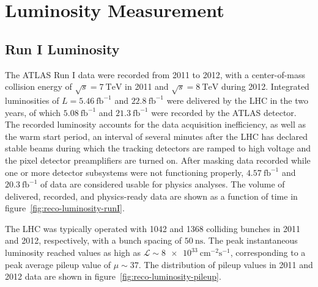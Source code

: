 \chapter{Luminosity Measurement}\label{ch:luminosity}
\section{Run I Luminosity}

The ATLAS Run I data were recorded from 2011 to 2012, with a center-of-mass collision energy of $\sqrt{s}=\SI{7}{\tera\electronvolt}$ in 2011 and $\sqrt{s}=\SI{8}{\tera\electronvolt}$ during 2012. Integrated luminosities of $L=\SI{5.46}{\femto\barn\tothe{-1}}$ and $\SI{22.8}{\femto\barn\tothe{-1}}$ were delivered by the LHC in the two years, of which $\SI{5.08}{\femto\barn\tothe{-1}}$ and $\SI{21.3}{\femto\barn\tothe{-1}}$ were recorded by the ATLAS detector. The recorded luminosity accounts for the data acquisition inefficiency, as well as the warm start period, an interval of several minutes after the LHC has declared stable beams during which the tracking detectors are ramped to high voltage and the pixel detector preamplifiers are turned on. After masking data recorded while one or more detector subsystems were not functioning properly, $\SI{4.57}{\femto\barn\tothe{-1}}$ and $\SI{20.3}{\femto\barn\tothe{-1}}$ of data are considered usable for physics analyses. The volume of delivered, recorded, and physics-ready data are shown as a function of time in figure~\ref{fig:reco-luminosity-runI}. 

The LHC was typically operated with 1042 and 1368 colliding bunches in 2011 and 2012, respectively, with a bunch spacing of $\SI{50}{\nano\second}$. The peak instantaneous luminosity reached values as high as $\mathcal{L}\sim\SI[per-mode=symbol]{8e33}{\centi\meter\tothe{-2}\second\tothe{-1}}$, corresponding to a peak average pileup value of $\mu\sim37$. The distribution of pileup values in 2011 and 2012 data are shown in figure~\ref{fig:reco-luminosity-pileup}. 

